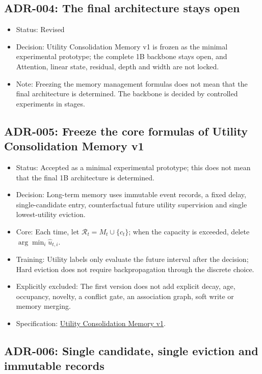 \subsection*{ADR-004: The final architecture stays open}

\begin{itemize}
  \item Status: Revised
  \item Decision: Utility Consolidation Memory v1 is frozen as the minimal experimental prototype; the complete 1B backbone stays open, and Attention, linear state, residual, depth and width are not locked.
  \item Note: Freezing the memory management formulas does not mean that the final architecture is determined. The backbone is decided by controlled experiments in stages.
\end{itemize}

\subsection*{ADR-005: Freeze the core formulas of Utility Consolidation Memory v1}

\begin{itemize}
  \item Status: Accepted as a minimal experimental prototype; this does not mean that the final 1B architecture is determined.
  \item Decision: Long-term memory uses immutable event records, a fixed delay, single-candidate entry, counterfactual future utility supervision and single lowest-utility eviction.
  \item Core: Each time, let $\mathcal R_t=M_t\cup\{c_t\}$; when the capacity is exceeded, delete $\arg\min_i\hat u_{t,i}$.
  \item Training: Utility labels only evaluate the future interval after the decision; Hard eviction does not require backpropagation through the discrete choice.
  \item Explicitly excluded: The first version does not add explicit decay, age, occupancy, novelty, a conflict gate, an association graph, soft write or memory merging.
  \item Specification: \href{utility-consolidation-memory-v1.md}{Utility Consolidation Memory v1}.
\end{itemize}

\subsection*{ADR-006: Single candidate, single eviction and immutable records}

